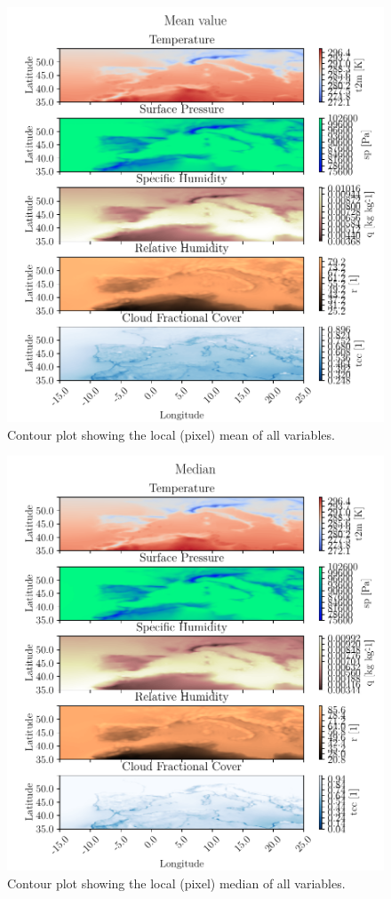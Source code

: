\begin{figure}[ht]
    \centering
    \includegraphics{python_figs/contourplot_all_variables_mean.pdf}
    \caption{Contour plot showing the local (pixel) mean of all variables.}
    \label{fig:contour_mean_all_vars}
\end{figure}


\begin{figure}[ht]
    \centering
    \includegraphics{python_figs/contourplot_all_variables_median.pdf}
    \caption{Contour plot showing the local (pixel) median of all variables.}
    \label{fig:contour_mean_all_vars}
\end{figure}

